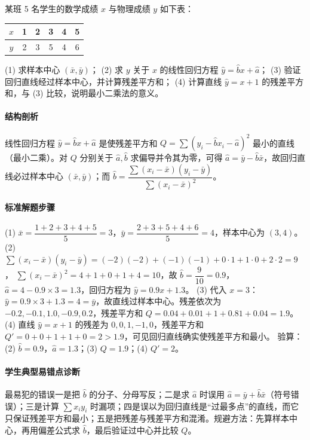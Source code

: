 \begin{problem}
某班 5 名学生的数学成绩 $x$ 与物理成绩 $y$ 如下表：
\begin{center}
\begin{tabular}{c|ccccc}
$x$ & 1 & 2 & 3 & 4 & 5\\
\hline
$y$ & 2 & 3 & 5 & 4 & 6
\end{tabular}
\end{center}
(1) 求样本中心 $(\bar x,\bar y)$；
(2) 求 $y$ 关于 $x$ 的线性回归方程 $\hat y=\hat b x+\hat a$；
(3) 验证回归直线经过样本中心，并计算残差平方和；
(4) 计算直线 $\hat y=x+1$ 的残差平方和，与 (3) 比较，说明最小二乘法的意义。
\end{problem}
\begin{solution}
\paragraph{结构剖析}
线性回归方程 $\hat y=\hat b x+\hat a$ 是使残差平方和 $Q=\sum(y_i-\hat b x_i-\hat a)^2$ 最小的直线（最小二乘）。对 $Q$ 分别关于 $\hat a,\hat b$ 求偏导并令其为零，可得 $\hat a=\bar y-\hat b\bar x$，故回归直线必过样本中心 $(\bar x,\bar y)$；而 $\hat b=\dfrac{\sum(x_i-\bar x)(y_i-\bar y)}{\sum(x_i-\bar x)^2}$。
\paragraph{标准解题步骤}
(1) $\bar x=\dfrac{1+2+3+4+5}{5}=3$，$\bar y=\dfrac{2+3+5+4+6}{5}=4$，样本中心为 $(3,4)$。
(2) $\sum(x_i-\bar x)(y_i-\bar y)=(-2)(-2)+(-1)(-1)+0\cdot1+1\cdot0+2\cdot2=9$，
$\sum(x_i-\bar x)^2=4+1+0+1+4=10$，故 $\hat b=\dfrac9{10}=0.9$，$\hat a=4-0.9\times3=1.3$，回归方程为 $\hat y=0.9x+1.3$。
(3) 代入 $x=3$：$\hat y=0.9\times3+1.3=4=\bar y$，故直线过样本中心。残差依次为 $-0.2,-0.1,1.0,-0.9,0.2$，残差平方和 $Q=0.04+0.01+1+0.81+0.04=1.9$。
(4) 直线 $\hat y=x+1$ 的残差为 $0,0,1,-1,0$，残差平方和 $Q'=0+0+1+1+0=2>1.9$，可见回归直线确实使残差平方和最小。
验算：(2) $\hat b=0.9$，$\hat a=1.3$；(3) $Q=1.9$；(4) $Q'=2$。
\paragraph{学生典型易错点诊断}
最易犯的错误一是把 $\hat b$ 的分子、分母写反；二是求 $\hat a$ 时误用 $\hat a=\bar y+\hat b\bar x$（符号错误）；三是计算 $\sum x_iy_i$ 时漏项；四是误以为回归直线是“过最多点”的直线，而它只保证残差平方和最小；五是把残差与残差平方和混淆。规避方法：先算样本中心，再用偏差公式求 $\hat b$，最后验证过中心并比较 $Q$。
\end{solution}

